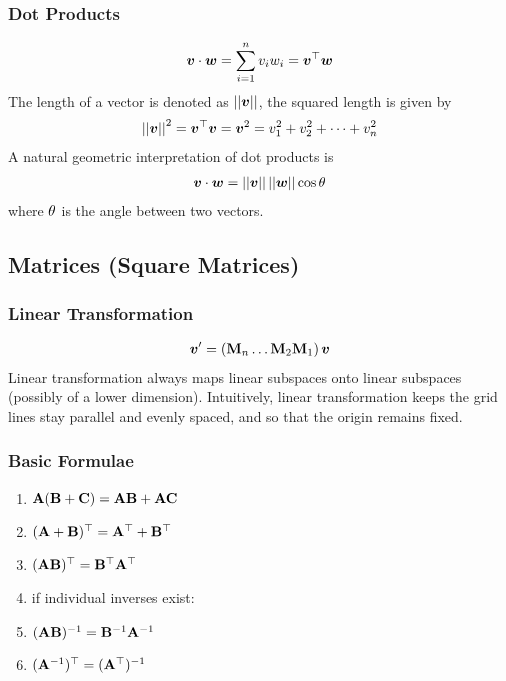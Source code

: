 \subsubsection*{Dot Products}

\begin{align*}
	\boldsymbol{v}\cdot\boldsymbol{w}=\sum_{i=1}^nv_iw_i=\boldsymbol{v}{}^\top\boldsymbol{w}
\end{align*}
The length of a vector is denoted as $\left\vert\left\vert \boldsymbol{v} \right\vert\right\vert$, the squared length is given by
\begin{align*}
	\left\vert\left\vert \boldsymbol{v} \right\vert\right\vert^2=\boldsymbol{v}{}^\top\boldsymbol{v}=\boldsymbol{v}^2=v_1^2+v_2^2+\dots+v_n^2
\end{align*}
A natural geometric interpretation of dot products is
\begin{align*}
	\boldsymbol{v}\cdot\boldsymbol{w}=\left\vert\left\vert \boldsymbol{v} \right\vert\right\vert\left\vert\left\vert \boldsymbol{w} \right\vert\right\vert\cos\theta
\end{align*}
where $\theta$ is the angle between two vectors.

\subsection{Matrices (Square Matrices)}

\subsubsection*{Linear Transformation}

\begin{align*}
	\boldsymbol{v}'=\left(\mathbf{M}_n\dots\mathbf{M}_2\mathbf{M}_1\right)\boldsymbol{v}
\end{align*}
Linear transformation always maps linear subspaces onto linear subspaces (possibly of a lower dimension). Intuitively, linear transformation keeps the grid lines stay parallel and evenly spaced, and so that the origin remains fixed.

\subsubsection*{Basic Formulae}

\begin{enumerate}
	\item $\mathbf{A}(\mathbf{B}+\mathbf{C})=\mathbf{A}\mathbf{B}+\mathbf{A}\mathbf{C}$
	\item $(\mathbf{A}+\mathbf{B}){}^\top=\mathbf{A}{}^\top+\mathbf{B}{}^\top$
	\item $(\mathbf{A}\mathbf{B}){}^\top=\mathbf{B}{}^\top\mathbf{A}{}^\top$
	\item[] if individual inverses exist:
	\item $(\mathbf{A}\mathbf{B})^{-1}=\mathbf{B}^{-1}\mathbf{A}^{-1}$
	\item $(\mathbf{A}^{-1}){}^\top=(\mathbf{A}{}^\top)^{-1}$
\end{enumerate}

